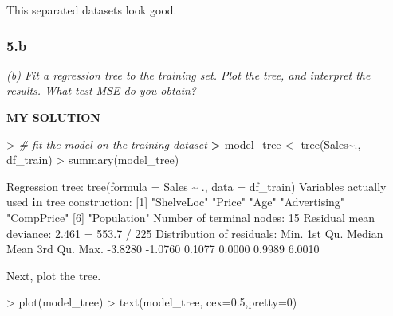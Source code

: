 \documentclass[
]{article}
\newenvironment{Shaded}{\begin{snugshade}}{\end{snugshade}}
\newcommand{\AttributeTok}[1]{\textcolor[rgb]{0.77,0.63,0.00}{#1}}
\newcommand{\CommentTok}[1]{\textcolor[rgb]{0.56,0.35,0.01}{\textit{#1}}}
\newcommand{\ControlFlowTok}[1]{\textcolor[rgb]{0.13,0.29,0.53}{\textbf{#1}}}
\newcommand{\DecValTok}[1]{\textcolor[rgb]{0.00,0.00,0.81}{#1}}
\newcommand{\ErrorTok}[1]{\textcolor[rgb]{0.64,0.00,0.00}{\textbf{#1}}}
\newcommand{\FloatTok}[1]{\textcolor[rgb]{0.00,0.00,0.81}{#1}}
\newcommand{\FunctionTok}[1]{\textcolor[rgb]{0.00,0.00,0.00}{#1}}
\newcommand{\NormalTok}[1]{#1}
\newcommand{\OtherTok}[1]{\textcolor[rgb]{0.56,0.35,0.01}{#1}}
\newcommand{\SpecialCharTok}[1]{\textcolor[rgb]{0.00,0.00,0.00}{#1}}
\newcommand{\StringTok}[1]{\textcolor[rgb]{0.31,0.60,0.02}{#1}}
\begin{document}
This separated datasets look good.

\hypertarget{b}{%
\subsubsection{5.b}\label{b}}

\emph{(b) Fit a regression tree to the training set. Plot the tree, and
interpret the results. What test MSE do you obtain?}

\textbf{MY SOLUTION}

\begin{Shaded}
\begin{Highlighting}[]
\SpecialCharTok{\textgreater{}} \CommentTok{\# fit the model on the training dataset }
\ErrorTok{\textgreater{}}\NormalTok{ model\_tree }\OtherTok{\textless{}{-}} \FunctionTok{tree}\NormalTok{(Sales}\SpecialCharTok{\textasciitilde{}}\NormalTok{., df\_train)}
\SpecialCharTok{\textgreater{}} \FunctionTok{summary}\NormalTok{(model\_tree)}

\NormalTok{Regression tree}\SpecialCharTok{:}
\FunctionTok{tree}\NormalTok{(}\AttributeTok{formula =}\NormalTok{ Sales }\SpecialCharTok{\textasciitilde{}}\NormalTok{ ., }\AttributeTok{data =}\NormalTok{ df\_train)}
\NormalTok{Variables actually used }\ControlFlowTok{in}\NormalTok{ tree construction}\SpecialCharTok{:}
\NormalTok{[}\DecValTok{1}\NormalTok{] }\StringTok{"ShelveLoc"}   \StringTok{"Price"}       \StringTok{"Age"}         \StringTok{"Advertising"} \StringTok{"CompPrice"}  
\NormalTok{[}\DecValTok{6}\NormalTok{] }\StringTok{"Population"} 
\NormalTok{Number of terminal nodes}\SpecialCharTok{:}  \DecValTok{15} 
\NormalTok{Residual mean deviance}\SpecialCharTok{:}  \FloatTok{2.461} \OtherTok{=} \FloatTok{553.7} \SpecialCharTok{/} \DecValTok{225} 
\NormalTok{Distribution of residuals}\SpecialCharTok{:}
\NormalTok{   Min. 1st Qu.  Median    Mean 3rd Qu.    Max. }
\SpecialCharTok{{-}}\FloatTok{3.8280} \SpecialCharTok{{-}}\FloatTok{1.0760}  \FloatTok{0.1077}  \FloatTok{0.0000}  \FloatTok{0.9989}  \FloatTok{6.0010} 
\end{Highlighting}
\end{Shaded}

Next, plot the tree.

\begin{Shaded}
\begin{Highlighting}[]
\SpecialCharTok{\textgreater{}} \FunctionTok{plot}\NormalTok{(model\_tree)}
\SpecialCharTok{\textgreater{}} \FunctionTok{text}\NormalTok{(model\_tree, }\AttributeTok{cex=}\FloatTok{0.5}\NormalTok{,}\AttributeTok{pretty=}\DecValTok{0}\NormalTok{)}
\end{Highlighting}
\end{Shaded}
\end{document}
